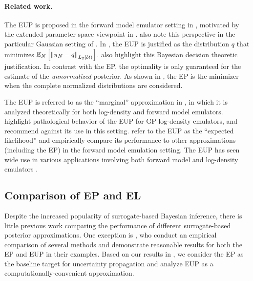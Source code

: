 \documentclass[12pt]{article}
\begin{document}
\paragraph{Related work.} The EUP is proposed in the forward model emulator setting 
in \citet{BilionisBayesSurrogates}, motivated by the extended parameter space viewpoint
in . \citet{StuartTeck2,CES} also note this perspective
in the particular Gaussian setting of .
In \citet{SinsbeckNowak}, the EUP is justified as the distribution 
$q$ that minimizes $\mathbb{E}_{N}\left[\left\lVert\pi_{N} - q\right\rVert_{L_2(\mathcal{U})} \right]$.
\citet{StuartTeck1,StuartTeck2,VehtariParallelGP} also highlight this Bayesian 
decision theoretic justification. 
In contrast with the EP, the optimality is only guaranteed for the estimate of the 
\textit{unnormalized} posterior.
As shown in , the EP is the minimizer when the complete 
normalized distributions are considered.

The EUP is referred to as the ``marginal'' approximation in 
\citet{StuartTeck1,StuartTeck2,random_fwd_models,TeckHyperpar},
in which it is analyzed theoretically for both log-density and forward 
model emulators. \citet{VehtariParallelGP} highlight pathological 
behavior of the EUP for GP log-density emulators, and recommend 
against its use in this setting. \citet{BurknerSurrogate} refer to 
the EUP as the ``expected likelihood'' and empirically compare its 
performance to other approximations (including the EP) in the 
forward model emulation setting. The EUP has seen wide 
use in various applications involving both forward model 
and log-density emulators 
\citep{weightedIVAR,GP_PDE_priors,CES,idealizedGCM,
villani2024posteriorsamplingadaptivegaussian,hydrologicalModel,hydrologicalModel2}.

\subsection{Comparison of EP and EL}
Despite the increased popularity of surrogate-based Bayesian inference, there is 
little previous work comparing the performance of different surrogate-based 
posterior approximations. One exception is \citet{BurknerSurrogate}, who conduct an 
empirical comparison of several methods and demonstrate reasonable results for 
both the EP and EUP in their examples. Based on our results in , 
we consider the EP as the baseline target for uncertainty propagation and analyze 
EUP as a computationally-convenient approximation.
\end{document}
